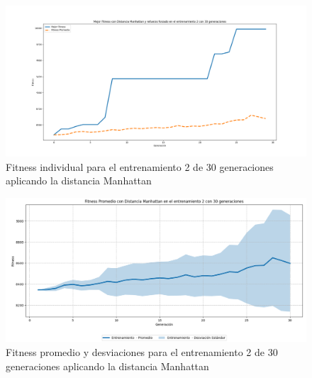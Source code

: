 \documentclass[conference]{IEEEtran}
\begin{document}
\begin{figure}[H]
    \centering
    \includegraphics[width=0.9 \linewidth]{Manhattan/Fitness_individual_30Gen/Fitness_2_Mahn_30Gen.png}
    \caption{Fitness individual para el entrenamiento 2 de 30 generaciones aplicando la distancia Manhattan}
    \label{fig:manhattan_2_30}
\end{figure}
\begin{figure}[H]
    \centering
    \includegraphics[width=0.9 \linewidth]{Manhattan/Fitness_individual_30Gen/Fitness_2_Mahn_30Gen_Sombra.png}
    \caption{Fitness promedio y desviaciones para el entrenamiento 2 de 30 generaciones aplicando la distancia Manhattan}
    \label{fig:manhattan_2_30_sombra}
\end{figure}
\end{document}

